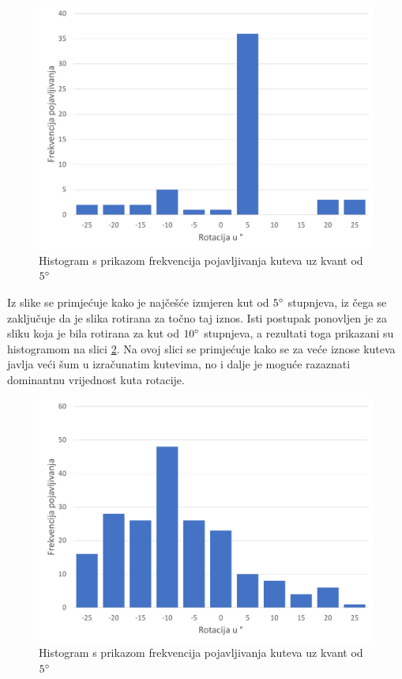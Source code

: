 \documentclass[times, utf8, zavrsni, numeric]{fer}
\begin{document}
\begin{figure}[ht!]
    \centering
    \includegraphics[width=.8\textwidth]{Images/Skew1.pdf}
    \captionsetup{justification=centering}
    \caption{Histogram s prikazom frekvencija pojavljivanja kuteva uz kvant od $5\degree$}
    \label{fig:skew1}
\end{figure}

Iz slike se primjećuje kako je najčešće izmjeren kut od $5\degree$ stupnjeva, iz čega se zaključuje da je slika rotirana za točno taj iznos.
Isti postupak ponovljen je za sliku koja je bila rotirana za kut od $10\degree$ stupnjeva, a rezultati toga prikazani su histogramom na slici \ref{fig:skew2}.
Na ovoj slici se primjećuje kako se za veće iznose kuteva javlja veći šum u izračunatim kutevima, no i dalje je moguće razaznati dominantnu vrijednost kuta rotacije.\\

\begin{figure}[ht!]
    \centering
    \includegraphics[width=.8\textwidth]{Images/Skew2.pdf}
    \captionsetup{justification=centering}
    \caption{Histogram s prikazom frekvencija pojavljivanja kuteva uz kvant od $5\degree$}
    \label{fig:skew2}
\end{figure}
\end{document}
